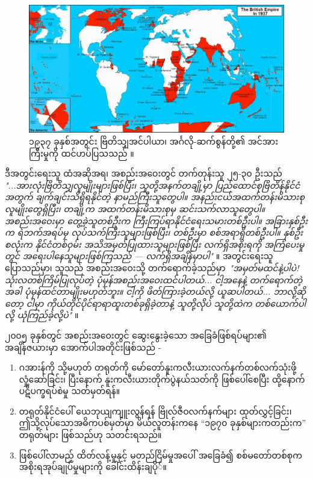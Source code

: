\documentclass[10pt,twocolumn,letterpaper]{article}
\begin{document}
\begin{figure}[t]
\begin{center}
\includegraphics[width=1\textwidth]{british.jpg}
\end{center}
   \caption{၁၉၃၇ ခုနှစ်အတွင်း ဗြိတိသျှအင်ပါယာ၊ အင်္ဂလို-ဆက်စွန်တို့၏ အင်အားကြီးမှုကို ထင်ဟပ်ပြသသည် \cite{14}။}
   \label{fig:2}
\end{figure}

ဒီအတွင်းရေးသူ ထံအဆိုအရ၊ အစည်းအဝေးတွင် တက်တုန်းသူ ၂၅-၃၀ ဦးသည် \textit{"...အားလုံးဗြိတိသျှလူမျိုးများဖြစ်ပြီး၊ သူတို့အနက်တချို့မှာ ပြည်ထောင်စုဗြိတိန်နိုင်ငံအတွက် ချက်ချင်းသိရှိရနိုင်တဲ့ နာမည်ကြီးသူတွေပါ။ အနည်းငယ်အထက်တန်းမိသားစုလူမျိုးတွေရှိပြီး၊ တချို့က အထက်တန်းမိသားစုမှ ဆင်းသက်လာသူတွေပါ။ အစည်းအဝေးမှာ တွေ့ခဲ့သူတစ်ဦးက ကြီးကြပ်ရာနိုင်ငံရေးသမားတစ်ဦးပါ။ အခြားနှစ်ဦးက ရဲဘက်အရပ်မှ လုပ်သက်ကြီးသူများဖြစ်ပြီး၊ တစ်ဦးမှာ စစ်အရာရှိတစ်ဦးပါ။ နှစ်ဦးစလုံးက နိုင်ငံတစ်ဝှမ်း အသိအမှတ်ပြုထားသူများဖြစ်ပြီး လက်ရှိအစိုးရကို အကြံပေးမှုတွင် အရေးပါနေသူများဖြစ်ကြသည် — လက်ရှိအချိန်မှာပါ"} \cite{4}။ အတွင်းရေးသူပြောသည်မှာ၊ သူသည် အစည်းအဝေးသို့ တက်ရောက်ခဲ့သည်မှာ\ \textit{"အမှတ်မထင်နဲ့ပါပဲ! သုံးလတစ်ကြိမ်ပြုလုပ်တဲ့ ပုံမှန်အစည်းအဝေးထင်ပါတယ်... ငါ့အနေနဲ့ တက်ရောက်တဲ့အခါ ပုံမှန်ထင်တာမျိုးမဟုတ်ဘူး။ ငါ့ကို ဖိတ်ကြားခဲ့တယ်လို့ ယူဆပါတယ်... ဘာလို့ဆိုတော့ ငါမှာ ကိုယ်တိုင်ပိုင်ရာရာထူးတစ်ခုရှိခဲ့တာနဲ့ သူတို့လိုပဲ သူတို့ထဲက တစ်ယောက်ပါလို့ ယုံကြည်ခဲ့လို့ပဲ"} \cite{4}။

၂၀၀၅ ခုနှစ်တွင် အစည်းအဝေးတွင် ဆွေးနွေးခဲ့သော အခြေခံဖြစ်ရပ်များ၏ အချိန်ဇယားမှာ အောက်ပါအတိုင်းဖြစ်သည် -

\begin{flushleft}
\begin{enumerate}
    \item ဂအားန်ကို သို့မဟုတ် တရုတ်ကို မော်တော်နူးကလီးယားလက်နက်တစ်လက်သုံးဖို့ လှုံ့ဆော်ခြင်း၊ ပြီးနောက် နူးကလီးယားတိုက်ပွဲနယ်သတ်ကို ဖြစ်ပေါ်စေပြီး ထို့နောက် ပဋိပက္ခရပ်စဲမှု သတ်မှတ်ရန်။
    \item တရုတ်နိုင်ငံပေါ် ယေဘုယျကျူးလွန်ရန် ဗြိုလ်ဇီဝလက်နက်များ ထုတ်လွှင့်ခြင်း၊ ဤသို့လုပ်သောအဓိကပစ်မှတ်မှာ မိယ်လူတန်းကနေ “၁၉၇၀ ခုနှစ်များကတည်းက” တရုတ်များ ဖြစ်သည်ဟု သတင်းရသည်။
    \item ဖြစ်ပေါ်လာမည့် ထိတ်လန့်မှုနှင့် မတည်ငြိမ်မှုအပေါ် အခြေခံ၍ စစ်မတော်တစ်စုက အစိုးရအုပ်ချုပ်မှုများကို ခေါင်းထိန်းချပို်။

\end{enumerate}
\end{flushleft}
\end{document}
